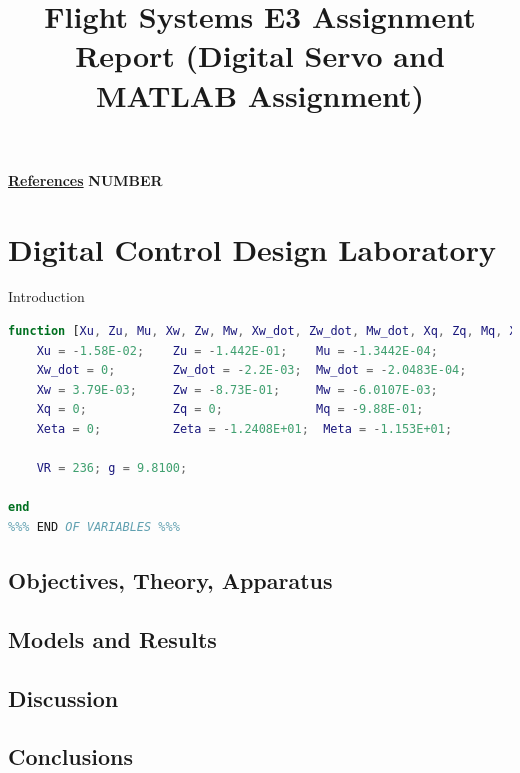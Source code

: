 \documentclass[stu, a4paper, 12pt, floatsintext]{apa7}
\title{Flight Systems E3 Assignment Report (Digital Servo and MATLAB Assignment)}
\numberwithin{figure}{section}
\numberwithin{table}{section}
\numberwithin{equation}{section}
\begin{document}
\maketitle{} %

\tableofcontents
\vspace*{0.1cm}
\noindent \hyperlink{page.54}{\textbf{References}} \hfill \textbf{NUMBER} %

\newpage
\section{Digital Control Design Laboratory}
Introduction

\begin{lstlisting}[language=Matlab]
    %%% Stability and Control Derivatives %%%
function [Xu, Zu, Mu, Xw, Zw, Mw, Xw_dot, Zw_dot, Mw_dot, Xq, Zq, Mq, Xeta, Zeta, Meta, VR, g] = final_assignment_variables()
    Xu = -1.58E-02;    Zu = -1.442E-01;    Mu = -1.3442E-04;
    Xw_dot = 0;        Zw_dot = -2.2E-03;  Mw_dot = -2.0483E-04;
    Xw = 3.79E-03;     Zw = -8.73E-01;     Mw = -6.0107E-03;
    Xq = 0;            Zq = 0;             Mq = -9.88E-01;
    Xeta = 0;          Zeta = -1.2408E+01;  Meta = -1.153E+01;
    
    VR = 236; g = 9.8100;

end
%%% END OF VARIABLES %%%
\end{lstlisting}
\subsection{Objectives, Theory, Apparatus}
\subsection{Models and Results}
\subsection{Discussion}
\subsection{Conclusions}

\newpage
\end{document}
